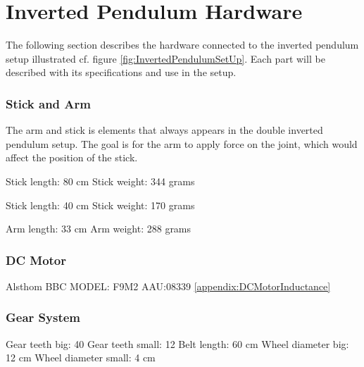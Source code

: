 \section{Inverted Pendulum Hardware}
The following section describes the hardware connected to the inverted pendulum setup illustrated cf. figure \ref{fig:InvertedPendulumSetUp}.
Each part will be described with its specifications and use in the setup.

\subsubsection{Stick and Arm}
The arm and stick is elements that always appears in the double inverted pendulum setup. The goal is for the arm to apply force on the joint, which would affect the position of the stick. 

Stick length: 80 cm
Stick weight: 344 grams

Stick length: 40 cm
Stick weight: 170 grams
 
Arm length: 33 cm
Arm weight: 288 grams

\subsubsection{DC Motor}
Alsthom BBC MODEL: F9M2 AAU:08339
\ref{appendix:DCMotorInductance}

\subsubsection{Gear System}
Gear teeth big: 40
Gear teeth small: 12
Belt length: 60 cm
Wheel diameter big: 12 cm
Wheel diameter small: 4 cm
